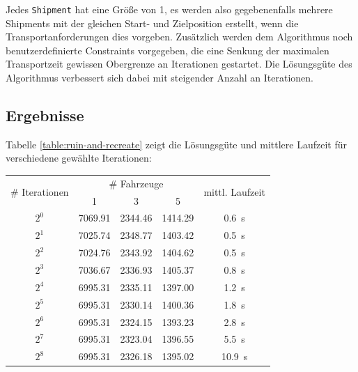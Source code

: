 \documentclass[ngerman]{tudscrreprt}
\newcommand{\code}[1]{\texttt{#1}}
\begin{document}
Jedes \code{Shipment} hat eine Größe von \num{1}, es werden also gegebenenfalls mehrere
Shipments mit der gleichen Start- und Zielposition erstellt, wenn die
Transportanforderungen dies vorgeben. Zusätzlich werden dem Algorithmus noch
benutzerdefinierte Constraints vorgegeben, die eine Senkung der maximalen Transportzeit
gewissen Obergrenze an Iterationen gestartet. Die Lösungsgüte des Algorithmus verbessert sich
dabei mit steigender Anzahl an Iterationen.

\subsection{Ergebnisse}
Tabelle \ref{table:ruin-and-recreate} zeigt die Lösungsgüte und mittlere Laufzeit für verschiedene
gewählte Iterationen:
%
\begin{table}[H]
    \centering
    \begin{tabular}{|c|c|c|c|c|}
    \hline
    \multirow{2}{*}{\# Iterationen} & \multicolumn{3}{c|}{\# Fahrzeuge} & \multirow{2}{*}{mittl. Laufzeit} \\ \cline{2-4}
                                    & 1             & 3             & 5             &                      \\ \hline
    $2^0$                           & \num{7069.91} & \num{2344.46} & \num{1414.29} & \SI{0.6}{\s}         \\ \hline
    $2^1$                           & \num{7025.74} & \num{2348.77} & \num{1403.42} & \SI{0.5}{\s}         \\ \hline
    $2^2$                           & \num{7024.76} & \num{2343.92} & \num{1404.62} & \SI{0.5}{\s}         \\ \hline
    $2^3$                           & \num{7036.67} & \num{2336.93} & \num{1405.37} & \SI{0.8}{\s}         \\ \hline
    $2^4$                           & \num{6995.31} & \num{2335.11} & \num{1397.00} & \SI{1.2}{\s}         \\ \hline
    $2^5$                           & \num{6995.31} & \num{2330.14} & \num{1400.36} & \SI{1.8}{\s}         \\ \hline
    $2^6$                           & \num{6995.31} & \num{2324.15} & \num{1393.23} & \SI{2.8}{\s}         \\ \hline
    $2^7$                           & \num{6995.31} & \num{2323.04} & \num{1396.55} & \SI{5.5}{\s}         \\ \hline
    $2^8$                           & \num{6995.31} & \num{2326.18} & \num{1395.02} & \SI{10.9}{\s}        \\ \hline

\end{tabular}
\end{table}
\end{document}
